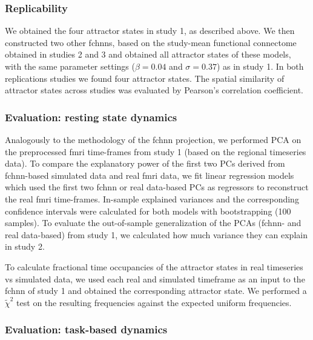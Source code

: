 \documentclass{article}
\begin{document}
\subsubsection{Replicability}\label{Replicability}

We obtained the four attractor states in study 1, as described above. We then constructed two other \acrshort{fchnn}s, based on the study-mean functional connectome obtained in studies 2 and 3 and  obtained all attractor states of these models, with the same parameter settings ($\beta = 0.04$ and $\sigma = 0.37$) as in study 1. In both replications studies we found four attractor states. The spatial similarity of attractor states across studies was evaluated by Pearson's correlation coefficient.

\subsubsection{Evaluation: resting state dynamics}\label{Evaluation: resting state dynamics}

Analogously to the methodology of the \acrshort{fchnn} projection, we performed PCA on the preprocessed \acrshort{fmri} time-frames from study 1 (based on the regional timeseries data).
To compare the explanatory power of the first two PCs derived from \acrshort{fchnn}-based simulated data and real \acrshort{fmri} data, we fit linear regression models which used the first two \acrshort{fchnn} or real data-based PCs as regressors to reconstruct the real \acrshort{fmri} time-frames. In-sample explained variances and the corresponding confidence intervals were calculated for both models with bootstrapping (100 samples). To evaluate the out-of-sample generalization of the PCAs (\acrshort{fchnn}- and real data-based) from study 1, we calculated how much variance they can explain in study 2.

To calculate fractional time occupancies of the attractor states in real timeseries vs simulated data, we used each real and simulated timeframe as an input to the \acrshort{fchnn} of study 1 and obtained the corresponding attractor state. We performed a $\tilde{\chi}^2$ test on the resulting frequencies against the expected uniform frequencies.

\subsubsection{Evaluation: task-based dynamics}\label{Evaluation: task-based dynamics}
\end{document}
